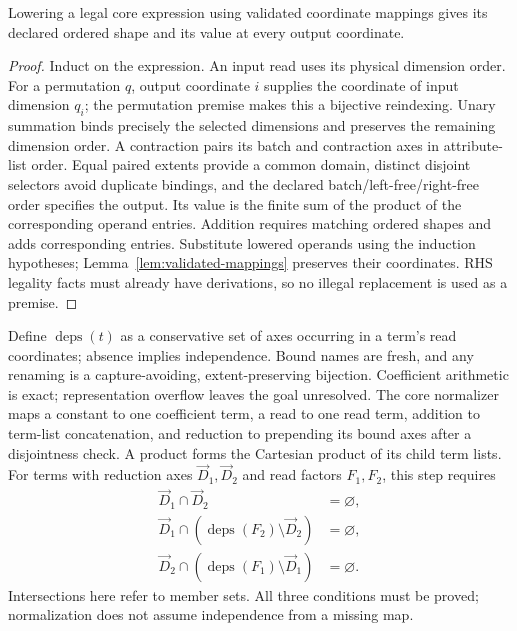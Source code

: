 \begin{lemma}
\label{lem:core-lowering}
Lowering a legal core expression using validated coordinate mappings gives
its declared ordered shape and its value at every output coordinate.
\end{lemma}
\begin{proof}
Induct on the expression. An input read uses its physical dimension order.
For a permutation $q$, output coordinate $i$ supplies the coordinate of
input dimension $q_i$; the permutation premise makes this a bijective
reindexing. Unary summation binds precisely the selected dimensions and
preserves the remaining dimension order. A contraction pairs its batch and
contraction axes in attribute-list order. Equal paired extents provide a
common domain, distinct disjoint selectors avoid duplicate bindings, and
the declared batch/left-free/right-free order specifies the output. Its
value is the finite sum of the product of the corresponding operand
entries. Addition requires matching ordered shapes and adds corresponding
entries. Substitute lowered operands using the induction hypotheses;
Lemma~\ref{lem:validated-mappings} preserves their coordinates. RHS
legality facts must already have derivations, so no illegal replacement is
used as a premise.
\end{proof}

Define $\operatorname{deps}(t)$ as a conservative set of axes occurring in
a term's read coordinates; absence implies independence. Bound names are
fresh, and any renaming is a capture-avoiding, extent-preserving bijection.
Coefficient arithmetic is exact; representation overflow leaves the goal
unresolved. The core normalizer maps a constant to one coefficient term, a read to one
read term, addition to term-list concatenation, and reduction to prepending
its bound axes after a disjointness check. A product forms the Cartesian
product of its child term lists. For terms with reduction axes $\vec D_1,\vec D_2$
and read factors $F_1,F_2$, this step requires
\begin{equation}
\begin{aligned}
 \vec D_1\cap \vec D_2&=\varnothing,\\
 \vec D_1\cap(\operatorname{deps}(F_2)\setminus \vec D_2)&=\varnothing,\\
 \vec D_2\cap(\operatorname{deps}(F_1)\setminus \vec D_1)&=\varnothing.
\end{aligned}
\end{equation}
Intersections here refer to member sets. All three conditions must be
proved; normalization does not assume independence from a missing map.

